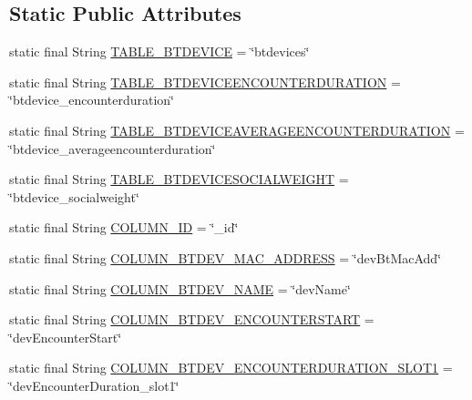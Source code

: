 \subsection*{Static Public Attributes}
\begin{DoxyCompactItemize}
\item 
static final String \hyperlink{classcom_1_1social_1_1proximity_1_1_s_q_lite_helper_a5826d20868ba7e0d81bfb3de783baf07}{T\+A\+B\+L\+E\+\_\+\+B\+T\+D\+E\+V\+I\+C\+E} = \char`\"{}btdevices\char`\"{}
\item 
static final String \hyperlink{classcom_1_1social_1_1proximity_1_1_s_q_lite_helper_a7a34326231133feb3823c4fa9284e729}{T\+A\+B\+L\+E\+\_\+\+B\+T\+D\+E\+V\+I\+C\+E\+E\+N\+C\+O\+U\+N\+T\+E\+R\+D\+U\+R\+A\+T\+I\+O\+N} = \char`\"{}btdevice\+\_\+encounterduration\char`\"{}
\item 
static final String \hyperlink{classcom_1_1social_1_1proximity_1_1_s_q_lite_helper_a7d315c0f15f61c01bac3aba824e6bbce}{T\+A\+B\+L\+E\+\_\+\+B\+T\+D\+E\+V\+I\+C\+E\+A\+V\+E\+R\+A\+G\+E\+E\+N\+C\+O\+U\+N\+T\+E\+R\+D\+U\+R\+A\+T\+I\+O\+N} = \char`\"{}btdevice\+\_\+averageencounterduration\char`\"{}
\item 
static final String \hyperlink{classcom_1_1social_1_1proximity_1_1_s_q_lite_helper_a151e3b34b78b984d2dde9c2ea58d549e}{T\+A\+B\+L\+E\+\_\+\+B\+T\+D\+E\+V\+I\+C\+E\+S\+O\+C\+I\+A\+L\+W\+E\+I\+G\+H\+T} = \char`\"{}btdevice\+\_\+socialweight\char`\"{}
\item 
static final String \hyperlink{classcom_1_1social_1_1proximity_1_1_s_q_lite_helper_ae0e5a93fedecddb46106b02b939e4601}{C\+O\+L\+U\+M\+N\+\_\+\+I\+D} = \char`\"{}\+\_\+id\char`\"{}
\item 
static final String \hyperlink{classcom_1_1social_1_1proximity_1_1_s_q_lite_helper_a24fb4cdd15815c0527eecadbb7fb5f12}{C\+O\+L\+U\+M\+N\+\_\+\+B\+T\+D\+E\+V\+\_\+\+M\+A\+C\+\_\+\+A\+D\+D\+R\+E\+S\+S} = \char`\"{}dev\+Bt\+Mac\+Add\char`\"{}
\item 
static final String \hyperlink{classcom_1_1social_1_1proximity_1_1_s_q_lite_helper_af43c8ca7e0fb3301d929481e93a6b449}{C\+O\+L\+U\+M\+N\+\_\+\+B\+T\+D\+E\+V\+\_\+\+N\+A\+M\+E} = \char`\"{}dev\+Name\char`\"{}
\item 
static final String \hyperlink{classcom_1_1social_1_1proximity_1_1_s_q_lite_helper_aa1144aca9189f5fec6b5e19ac5887e89}{C\+O\+L\+U\+M\+N\+\_\+\+B\+T\+D\+E\+V\+\_\+\+E\+N\+C\+O\+U\+N\+T\+E\+R\+S\+T\+A\+R\+T} = \char`\"{}dev\+Encounter\+Start\char`\"{}
\item 
static final String \hyperlink{classcom_1_1social_1_1proximity_1_1_s_q_lite_helper_a868a3972f2b8525dc6f9405ced3646a1}{C\+O\+L\+U\+M\+N\+\_\+\+B\+T\+D\+E\+V\+\_\+\+E\+N\+C\+O\+U\+N\+T\+E\+R\+D\+U\+R\+A\+T\+I\+O\+N\+\_\+\+S\+L\+O\+T1} = \char`\"{}dev\+Encounter\+Duration\+\_\+slot1\char`\"{}

\end{DoxyCompactItemize}
